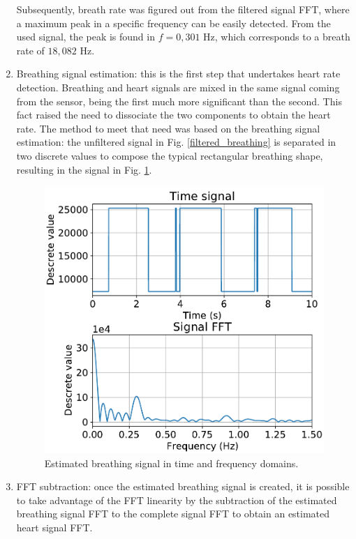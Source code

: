 \documentclass[twoside, twocolumn, spanish] {article}
\begin{document}
\begin{enumerate}
Subsequently, breath rate was figured out from the filtered signal FFT, where a maximum peak in a specific frequency can be easily detected. From the used signal, the peak is found in $f=0,301$ Hz, which corresponds to a breath rate of $18,082$ Hz.

\item Breathing signal estimation: this is the first step that undertakes heart rate detection. Breathing and heart signals are mixed in the same signal coming from the sensor, being the first much more significant than the second. This fact raised the need to dissociate the two components to obtain the heart rate. 
The method to meet that need was based on the breathing signal estimation: the unfiltered signal in Fig. \ref{filtered_breathing} is separated in two discrete values to compose the typical rectangular breathing shape, resulting in the signal in Fig. \ref{estimation}.

\begin{figure}[!h]
\centering
\includegraphics[width=\columnwidth]{imag/proc6}
\caption{Estimated breathing signal in time and frequency domains.}  \label{estimation}
\end{figure}


\item FFT subtraction: once the estimated breathing signal is created, it is possible to take advantage of the FFT linearity by the subtraction of the estimated breathing signal FFT to the complete signal FFT to obtain an estimated heart signal FFT.


\end{enumerate}
\end{document}
